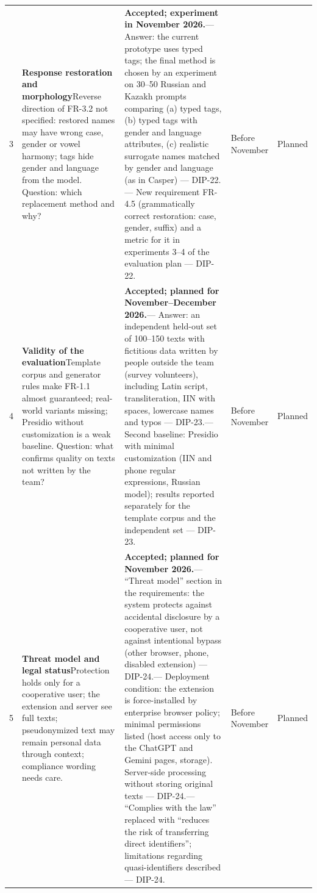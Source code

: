 \documentclass[12pt,a4paper]{article}
\newcommand{\rl}{\arrayrulecolor{linegray}\hline\arrayrulecolor{black}}
\begin{document}
{\begin{xltabular}{\linewidth}{P{0.5cm}P{4.4cm}LP{1.7cm}P{1.5cm}}
3 & \textbf{Response restoration and morphology}\newline Reverse direction of FR-3.2 not specified: restored names may have wrong case, gender or vowel harmony; tags hide gender and language from the model. Question: which replacement method and why? & \textbf{Accepted; experiment in November 2026.}\newline --- Answer: the current prototype uses typed tags; the final method is chosen by an experiment on 30--50 Russian and Kazakh prompts comparing (a) typed tags, (b) typed tags with gender and language attributes, (c) realistic surrogate names matched by gender and language (as in Casper) --- DIP-22.\newline --- New requirement FR-4.5 (grammatically correct restoration: case, gender, suffix) and a metric for it in experiments 3--4 of the evaluation plan --- DIP-22. & Before November & Planned \\ \rl
4 & \textbf{Validity of the evaluation}\newline Template corpus and generator rules make FR-1.1 almost guaranteed; real-world variants missing; Presidio without customization is a weak baseline. Question: what confirms quality on texts not written by the team? & \textbf{Accepted; planned for November--December 2026.}\newline --- Answer: an independent held-out set of 100--150 texts with fictitious data written by people outside the team (survey volunteers), including Latin script, transliteration, IIN with spaces, lowercase names and typos --- DIP-23.\newline --- Second baseline: Presidio with minimal customization (IIN and phone regular expressions, Russian model); results reported separately for the template corpus and the independent set --- DIP-23. & Before November & Planned \\ \rl
5 & \textbf{Threat model and legal status}\newline Protection holds only for a cooperative user; the extension and server see full texts; pseudonymized text may remain personal data through context; compliance wording needs care. & \textbf{Accepted; planned for November 2026.}\newline --- ``Threat model'' section in the requirements: the system protects against accidental disclosure by a cooperative user, not against intentional bypass (other browser, phone, disabled extension) --- DIP-24.\newline --- Deployment condition: the extension is force-installed by enterprise browser policy; minimal permissions listed (host access only to the ChatGPT and Gemini pages, storage). Server-side processing without storing original texts --- DIP-24.\newline --- ``Complies with the law'' replaced with ``reduces the risk of transferring direct identifiers''; limitations regarding quasi-identifiers described --- DIP-24. & Before November & Planned \\
\bottomrule
\end{xltabular}
}
\end{document}
